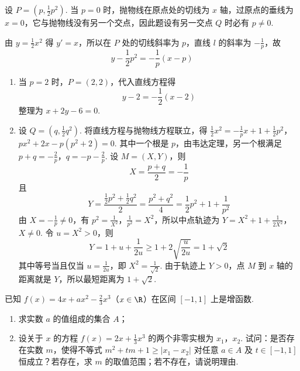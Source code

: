 \begin{solution}
设 \(P=(p,\frac12p^2)\). 当 \(p=0\) 时，抛物线在原点处的切线为 \(x\) 轴，过原点的垂线为 \(x=0\)，它与抛物线没有另一个交点，因此题设有另一交点 \(Q\) 时必有 \(p\neq0\).

由 \(y=\frac12x^2\) 得 \(y'=x\)，所以在 \(P\) 处的切线斜率为 \(p\)，直线 \(l\) 的斜率为 \(-\frac1p\)，故
\[
y-\frac12p^2=-\frac1p(x-p)
\]

\begin{enumerate}
\item 当 \(p=2\) 时，\(P=(2,2)\)，代入直线方程得
\[
y-2=-\frac12(x-2)
\]
整理为 \(x+2y-6=0\).
\item 设 \(Q=(q,\frac12q^2)\). 将直线方程与抛物线方程联立，得
\(\frac12x^2=-\frac1p x+1+\frac12p^2\)，\(px^2+2x-p(p^2+2)=0\).
其中一个根是 \(p\)，由韦达定理，另一个根满足
\(p+q=-\frac2p\)，\(q=-p-\frac2p\).
设 \(M=(X,Y)\)，则
\[
X=\frac{p+q}{2}=-\frac1p
\]
且
\[
Y=\frac{\frac12p^2+\frac12q^2}{2}=\frac{p^2+q^2}{4}
=\frac12p^2+1+\frac1{p^2}
\]
由 \(X=-\frac1p\neq0\)，有 \(p^2=\frac1{X^2}\)，\(\frac1{p^2}=X^2\)，所以中点轨迹为
\(Y=X^2+1+\frac1{2X^2}\)，\(X\neq0\).
令 \(u=X^2>0\)，则
\[
Y=1+u+\frac1{2u}\geq1+2\sqrt{\frac{u}{2u}}=1+\sqrt2
\]
其中等号当且仅当 \(u=\frac1{2u}\)，即 \(X^2=\frac1{\sqrt2}\). 由于轨迹上 \(Y>0\)，点 \(M\) 到 \(x\) 轴的距离就是 \(Y\)，所以最短距离为 \(1+\sqrt2\).
\end{enumerate}
\end{solution}

\begin{problem}
已知 \(f(x) = 4x + ax^2 - \frac{2}{3}x^3\)（\(x \in \R\)）在区间 \([-1,1]\) 上是增函数.

\begin{enumerate}
\item 求实数 \(a\) 的值组成的集合 \(A\)；
\item 设关于 \(x\) 的方程 \(f(x) = 2x + \frac{1}{3}x^3\) 的两个非零实根为 \(x_1\)，\(x_2\). 试问：是否存在实数 \(m\)，使得不等式 \(m^2 + tm + 1 \geqslant |x_1 - x_2|\) 对任意 \(a \in A\) 及 \(t \in [-1,1]\) 恒成立？若存在，求 \(m\) 的取值范围；若不存在，请说明理由.
\end{enumerate}
\end{problem}

